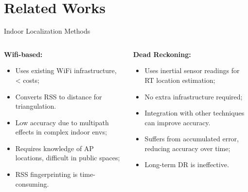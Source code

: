 \section[Works]{Related Works}

\begin{frame}{Indoor Localization Methods}
\addtolength{\leftmargini}{\labelsep}
	\begin{columns}[t]
		\begin{column}{0.5\textwidth}
			\textbf{Wifi-based:}\\
			\begin{itemize}
				\item Uses existing WiFi infrastructure, < costs;
				\item Converts RSS to distance for triangulation.
			\end{itemize}
			\begin{itemize}
				\item Low accuracy due to multipath effects in complex indoor envs;
				\item Requires knowledge of AP locations, difficult in public spaces;
				\item RSS fingerprinting is time-consuming.
			\end{itemize}
		\end{column}
		\begin{column}{0.5\textwidth}
			\textbf{Dead Reckoning:}\\
			\begin{itemize}
				\item Uses inertial sensor readings for RT location estimation;
				\item No extra infrastructure required;
				\item Integration with other techniques can improve accuracy.
			\end{itemize}
			\begin{itemize}
				\item Suffers from accumulated error, reducing accuracy over time;
				\item Long-term DR is ineffective.
			\end{itemize}
		\end{column}
	\end{columns}
\end{frame}


